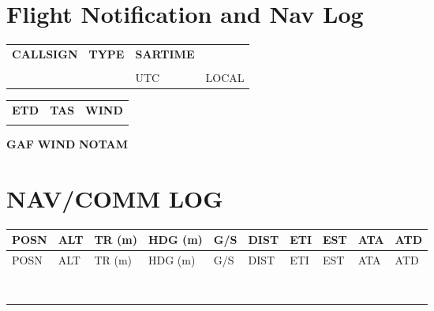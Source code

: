 \documentclass[a5paper,10pt]{article}
\newcommand{\boxheight}{0.5cm}
\newcommand{\boxwidthA}{2.5cm}
\newcommand{\boxwidthB}{3.5cm}
\newcommand{\inputbox}[2]{\fbox{\rule{0pt}{#1}\hspace{#2}}}
\newcommand{\checkbox}{\fbox{\rule{0pt}{0.3cm}\hspace{0.3cm}}}
\begin{document}
\small
\section*{Flight Notification and Nav Log}

\noindent
\begin{tabular}{p{3cm} p{3cm} p{3cm} p{3cm}}
\textbf{CALLSIGN} & \textbf{TYPE} & \textbf{SARTIME} & ~ \\
\inputbox{\boxheight}{\boxwidthA} & \inputbox{\boxheight}{\boxwidthA} & \inputbox{\boxheight}{\boxwidthA} & \inputbox{\boxheight}{\boxwidthA} \\
& & {\tiny UTC} & {\tiny LOCAL} \\
\end{tabular}

\vspace{0.1cm}

\noindent
\begin{tabular}{p{4cm} p{4cm} p{4cm}}
\textbf{ETD} & \textbf{TAS} & \textbf{WIND} \\
\inputbox{\boxheight}{\boxwidthB} & \inputbox{\boxheight}{\boxwidthB} & \inputbox{\boxheight}{\boxwidthB} \\
\end{tabular}

\vspace{0.3cm}

\noindent \textbf{GAF} \checkbox \hspace{1cm} \textbf{WIND} \checkbox \hspace{1cm} \textbf{NOTAM} \checkbox

\section*{NAV/COMM LOG}

\setlength{\tabcolsep}{4pt} %
\renewcommand{\arraystretch}{1} %

\begin{longtable}{|p{1cm}|p{1cm}|p{1cm}|p{1cm}|p{1cm}|p{1cm}|p{1cm}|p{1cm}|p{1cm}|p{1cm}|}
\hline
POSN & ALT & TR (m) & HDG (m) & G/S & DIST & ETI & EST & ATA & ATD \\ \hline
\endfirsthead
\hline
POSN & ALT & TR (m) & HDG (m) & G/S & DIST & ETI & EST & ATA & ATD \\ \hline
\endhead

& & & & & & & & & \\ \hline
& & & & & & & & & \\ \hline
& & & & & & & & & \\ \hline
& & & & & & & & & \\ \hline
& & & & & & & & & \\ \hline
& & & & & & & & & \\ \hline
& & & & & & & & & \\ \hline
& & & & & & & & & \\ \hline
\end{longtable}
\end{document}
